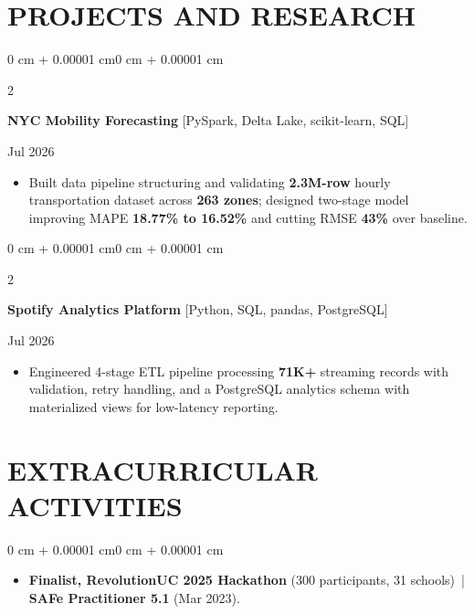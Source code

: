 \documentclass[10pt, letterpaper]{article}
\newenvironment{highlights}{
    \begin{itemize}[
        topsep=0.10 cm,
        parsep=0.06 cm,
        partopsep=0pt,
        itemsep=0.06 cm,
        leftmargin=12pt
    ]
}{
    \end{itemize}
}
\newenvironment{onecolentry}{
    \begin{adjustwidth}{0 cm + 0.00001 cm}{0 cm + 0.00001 cm}
}{
    \end{adjustwidth}
}
\newenvironment{twocolentry}[2][]{
    \onecolentry
    \def\secondColumn{#2}
    \setcolumnwidth{\fill, 4.5 cm}
    \begin{paracol}{2}
}{
    \switchcolumn \raggedleft \secondColumn
    \end{paracol}
    \endonecolentry
}
\begin{document}
\section{PROJECTS AND RESEARCH}
\begin{twocolentry}{Jul 2026}
\textbf{NYC Mobility Forecasting} [PySpark, Delta Lake, scikit-learn, SQL]
\end{twocolentry}
\begin{highlights}
  \item Built data pipeline structuring and validating \textbf{2.3M-row} hourly transportation dataset across \textbf{263 zones}; designed two-stage model improving MAPE \textbf{18.77\% to 16.52\%} and cutting RMSE \textbf{43\%} over baseline.
\end{highlights}

\vspace{0.12 cm}

\begin{twocolentry}{Jul 2026}
\textbf{Spotify Analytics Platform} [Python, SQL, pandas, PostgreSQL]
\end{twocolentry}
\begin{highlights}
  \item Engineered 4-stage ETL pipeline processing \textbf{71K+} streaming records with validation, retry handling, and a PostgreSQL analytics schema with materialized views for low-latency reporting.
\end{highlights}

\section{EXTRACURRICULAR ACTIVITIES}
\begin{onecolentry}
\begin{highlights}
  \item \textbf{Finalist, RevolutionUC 2025 Hackathon} (300 participants, 31 schools) \,|\, \textbf{SAFe Practitioner 5.1} (Mar 2023).
\end{highlights}
\end{onecolentry}
\end{document}

